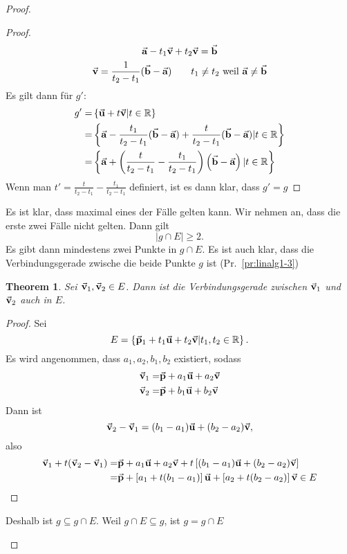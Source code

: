 \documentclass[prb,12pt]{revtex4-2}
\newtheorem{Theorem}{Theorem}
\theoremstyle{definition}
\theoremstyle{definition}
\newenvironment{parts}{\begin{enumerate}[label=(\alph*)]}{\end{enumerate}}
\newcommand{\R}{\mathbb{R}}
\begin{document}
\begin{proof}
\begin{parts}
\begin{proof}
\begin{gather*}
				\va a-t_1\va v+t_2\va v=\va b\\
				\va v = \frac{1}{t_2-t_1}(\va b - \va a)\qquad t_1\neq t_2\text{ weil }\va a \neq \va b
			\end{gather*}
			Es gilt dann f\"{u}r $g'$: 
			\begin{align*}
				g'=& \left\{ \va u+t\va v|t\in \R \right\} \\
				=& \left\{ \va a-\frac{t_1}{t_2-t_1}(\va b-\va a)+\frac{t}{t_2-t_1}(\va b-\va a)|t\in \R \right\}\\
				=& \left\{\va a+\left( \frac{t}{t_2-t_1}-\frac{t_1}{t_2-t_1} \right) \left( \va b -\va a \right) | t\in \R \right\}
			\end{align*}
			Wenn man $t'=\frac{t}{t_2-t_1}-\frac{t_1}{t_2-t_1}$ definiert, ist es dann klar, dass $g'=g$
		\end{proof}

			Es ist klar, dass maximal eines der F\"{a}lle gelten kann. Wir nehmen an, dass die erste zwei F\"{a}lle nicht gelten. Dann gilt
		\[
		|g\cap E|\ge 2
		.\] 
		Es gibt dann mindestens zwei Punkte in $g\cap E$. Es ist auch klar, dass die Verbindungsgerade zwische die beide Punkte $g$ ist (Pr.~\ref{pr:linalg1-3})


		\begin{Theorem}
			Sei $\va v_1, \va v_2\in E$. Dann ist die Verbindungsgerade zwischen $\va v_1$ und $\va v_2$ auch in $E$.
		\end{Theorem}
		\begin{proof}
			Sei
			\[
			E=\left\{ \va p_1+t_1\va u+t_2\va v|t_1,t_2\in \R \right\} 
			.\] 
			Es wird angenommen, dass $a_1,a_2,b_1,b_2$ existiert, sodass
			\begin{align*}
				\va v_1=& \va p+a_1\va u+a_2\va v\\
				\va v_2=&\va p+b_1\va u+b_2\va v
			\end{align*}
			Dann ist
			\[
			\va v_2-\va v_1=(b_1-a_1)\va u+(b_2-a_2)\va v,\]
			also
			\begin{align*}
				\va v_1+t(\va v_2-\va v_1)=& \va p+a_1\va u+a_2\va v+t\left[ (b_1-a_1)\va u+(b_2-a_2)\va v \right]\\
				=& \va p+\left[ a_1+t(b_1-a_1) \right] \va u+\left[ a_2+t(b_2-a_2) \right] \va v\in E
			\end{align*}
		\end{proof}

		Deshalb ist $g\subseteq g\cap E$. Weil $g\cap E\subseteq g$, ist $g=g\cap E$
	\end{parts}
\end{proof}
\end{document}
